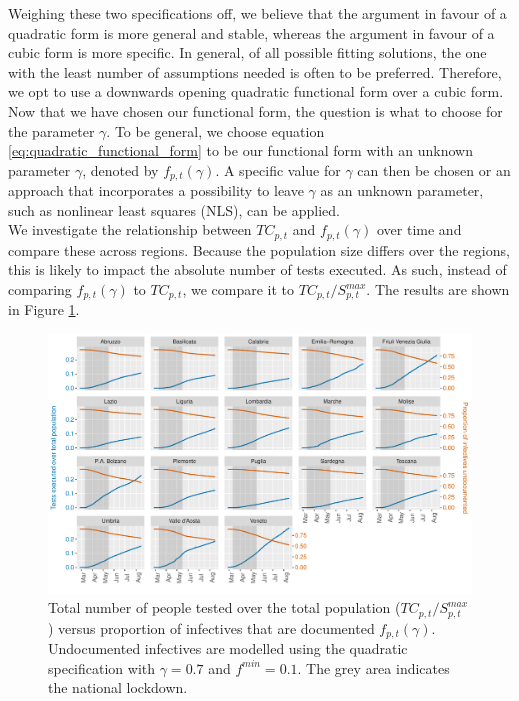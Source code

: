 \documentclass[12pt]{article}
\begin{document}
    Weighing these two specifications off, we believe that the argument in favour of a quadratic form is more general and stable, whereas the argument in favour of a cubic form is more specific. In general, of all possible fitting solutions, the one with the least number of assumptions needed is often to be preferred. Therefore, we opt to use a downwards opening quadratic functional form over a cubic form. Now that we have chosen our functional form, the question is what to choose for the parameter $\gamma$. %
    To be general, we choose equation \eqref{eq:quadratic_functional_form} to be our functional form with an unknown parameter $\gamma$, denoted by $f_{p,t}(\gamma)$. A specific value for $\gamma$ can then be chosen or an approach that incorporates a possibility to leave $\gamma$ as an unknown parameter, such as nonlinear least squares (NLS), can be applied.
    \\
	
	We investigate the relationship between $TC_{p,t}$ and $f_{p,t}(\gamma)$ over time and compare these across regions. Because the population size differs over the regions, this is likely to impact the absolute number of tests executed. As such, instead of comparing $f_{p,t}(\gamma)$ to $TC_{p,t}$, we compare it to $TC_{p,t} / S^{max}_{p,t}$. The results are shown in Figure \ref{fig:tamponiprop_versus_ft}. 
	
	\begin{figure}[H]
	    \centering
	    \includegraphics[width=\textwidth]{output/tamponiprop_vs_ft.pdf}
	    \caption{Total number of people tested over the total population ($TC_{p,t} / S^{max}_{p,t}$) versus proportion of infectives that are documented $f_{p,t}(\gamma)$. Undocumented infectives are modelled using the quadratic specification with $\gamma = 0.7$ and $f^{min}=0.1$. The grey area indicates the national lockdown.}
	    \label{fig:tamponiprop_versus_ft}
	\end{figure}
	
\end{document}
